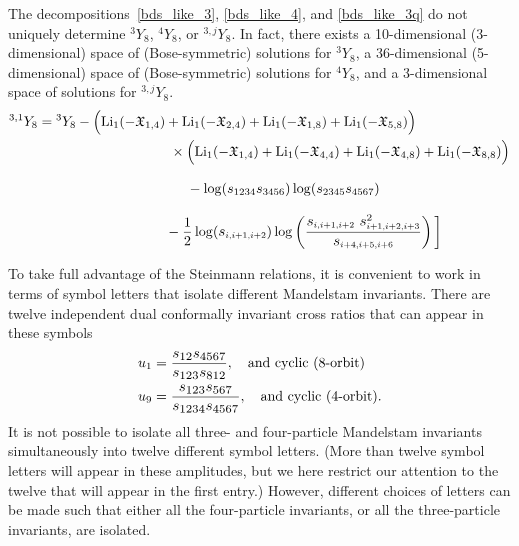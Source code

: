 \documentclass[11pt]{article}
\def\mand#1{\scaleto{s}{4.6pt}_{\scaleto{#1}{5.2pt}}}
\begin{document}
The decompositions~\eqref{bds_like_3}, \eqref{bds_like_4}, and \eqref{bds_like_3q} do not uniquely determine ${}^{3} Y_{8}$, ${}^{4} Y_{8}$, or ${}^{3,j} Y_{8}$. In fact, there exists a 10-dimensional (3-dimensional) space of (Bose-symmetric) solutions for ${}^{3} Y_{8}$, a 36-dimensional (5-dimensional) space of (Bose-symmetric) solutions for ${}^{4} Y_{8}$, and a 3-dimensional space of solutions for ${}^{3,j} Y_{8}$. 
 \begin{align}
{}^{3,1}Y_8 &= {}^{3}Y_8 -
\Big( \text{Li}_1(-\mathfrak{X}_{1, 4}) + \text{Li}_1(-\mathfrak{X}_{2, 4}) + \text{Li}_1(-\mathfrak{X}_{1, 8}) + \text{Li}_1(-\mathfrak{X}_{5, 8}) \Big)  \\
&\hspace{3.4cm} \times \Big( \text{Li}_1(-\mathfrak{X}_{1, 4}) + \text{Li}_1(-\mathfrak{X}_{4, 4}) + \text{Li}_1(-\mathfrak{X}_{4, 8}) + \text{Li}_1(-\mathfrak{X}_{8, 8}) \Big) \nonumber
\end{align}

 \begin{align*}
 &\ \hspace{1.4cm}- \log(s_{\scaleto{1234}{4.4pt}} s_{\scaleto{3456}{4.4pt}}) \log(s_{\scaleto{2345}{4.4pt}} s_{\scaleto{4567}{4.4pt}}) \nonumber
 \end{align*}
 
 \begin{align*}
&\ \hspace{2.4cm}- \frac12 \log(\mand{i,i+1,i+2}) \log\left(\frac{\mand{i,i+1,i+2} \ \mand{i+1,i+2,i+3}^2}{\mand{i+4,i+5,i+6}}\right) \bigg] \nonumber
 \end{align*}
 
 To take full advantage of the Steinmann relations, it is convenient to work in terms of symbol letters that isolate different Mandelstam invariants. There are twelve independent dual conformally invariant cross ratios that can appear in these symbols
\begin{align}
u_1 &= \frac{\mand{12} \mand{4567}}{\mand{123} \mand{812}}, \quad \text{and cyclic (8-orbit)} \\
u_9 &= \frac{\mand{123} \mand{567}}{\mand{1234} \mand{4567}}, \quad \text{and cyclic (4-orbit).}
\end{align}
It is not possible to isolate all three- and four-particle Mandelstam invariants simultaneously into twelve different symbol letters. (More than twelve symbol letters will appear in these amplitudes, but we here restrict our attention to the twelve that will appear in the first entry.) However, different choices of letters can be made such that either all the four-particle invariants, or all the three-particle invariants, are isolated.
\end{document}
